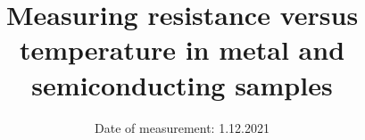 

\subject{\vspace{-4cm}Labreport 4}  %
\title{\vspace{-0.5cm}Measuring resistance versus temperature in metal and semiconducting samples} %
\date{\vspace{-0.5cm}
 Date of measurement: 1.12.2021  %
}




\twocolumn[
\maketitle
\begin{onecolabstract}
  
\end{onecolabstract}
]






\printbibliography{}



